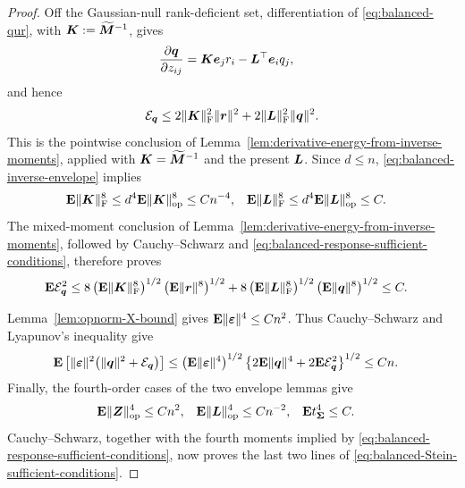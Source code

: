 \documentclass{article}
\theoremstyle{plain} %
\theoremstyle{definition} %
\theoremstyle{definition} %
\begin{document}
\begin{proof}
Off the Gaussian-null rank-deficient set, differentiation of
\eqref{eq:balanced-qur}, with $\boldsymbol{K}:=\widetilde{\boldsymbol{M}}^{-1}$, gives
\begin{align}
    \pdv{\boldsymbol{q}}{z_{ij}}
    &=\boldsymbol{K}\boldsymbol{e}_jr_i-\boldsymbol{L}^\top\boldsymbol{e}_iq_j,
    \label{eq:balanced-dot-q}
\end{align}
and hence
\begin{align}
    {\mathcal E}_{\boldsymbol{q}}
    \leq
      2\lVert\boldsymbol{K}\rVert_{\rm F}^2\lVert\boldsymbol{r}\rVert^2
      +2\lVert\boldsymbol{L}\rVert_{\rm F}^2\lVert\boldsymbol{q}\rVert^2.
    \label{eq:balanced-Dq-energy}
\end{align}
This is the pointwise conclusion of
Lemma~\ref{lem:derivative-energy-from-inverse-moments}, applied with
$\boldsymbol{K}=\widetilde{\boldsymbol{M}}^{-1}$ and the present $\boldsymbol{L}$.
Since $d\leq n$, \eqref{eq:balanced-inverse-envelope} implies
\begin{align*}
    {\mathbf{E}}\lVert\boldsymbol{K}\rVert_{\rm F}^{8}
    &\leq d^4{\mathbf{E}}\lVert\boldsymbol{K}\rVert_{\rm op}^{8}\leq Cn^{-4},
    &
    {\mathbf{E}}\lVert\boldsymbol{L}\rVert_{\rm F}^{8}
    &\leq d^4{\mathbf{E}}\lVert\boldsymbol{L}\rVert_{\rm op}^{8}\leq C.
\end{align*}
The mixed-moment conclusion of
Lemma~\ref{lem:derivative-energy-from-inverse-moments}, followed by
Cauchy--Schwarz and \eqref{eq:balanced-response-sufficient-conditions},
therefore proves
\begin{align*}
    {\mathbf{E}}{\mathcal E}_{\boldsymbol{q}}^2
    &\leq
      8\left({\mathbf{E}}\lVert\boldsymbol{K}\rVert_{\rm F}^{8}\right)^{1/2}
        \left({\mathbf{E}}\lVert\boldsymbol{r}\rVert^{8}\right)^{1/2}
      +8\left({\mathbf{E}}\lVert\boldsymbol{L}\rVert_{\rm F}^{8}\right)^{1/2}
        \left({\mathbf{E}}\lVert\boldsymbol{q}\rVert^{8}\right)^{1/2}
      \leq C.
\end{align*}

Lemma~\ref{lem:opnorm-X-bound} gives
${\mathbf{E}}\lVert{\boldsymbol{\varepsilon} }\rVert^{4}\leq Cn^2$.  Thus Cauchy--Schwarz and Lyapunov's
inequality give
\begin{align*}
    {\mathbf{E}}\left[
       \lVert{\boldsymbol{\varepsilon} }\rVert^{2}
       \bigl(\lVert\boldsymbol{q}\rVert^{2}+{\mathcal E}_{\boldsymbol{q}}\bigr)
    \right]
    &\leq
    \left({\mathbf{E}}\lVert{\boldsymbol{\varepsilon} }\rVert^{4}\right)^{1/2}
    \left\{2{\mathbf{E}}\lVert\boldsymbol{q}\rVert^{4}+2{\mathbf{E}}{\mathcal E}_{\boldsymbol{q}}^{2}\right\}^{1/2}
    \leq Cn.
\end{align*}
Finally, the fourth-order cases of the two envelope lemmas give
\begin{align*}
    {\mathbf{E}}\lVert\boldsymbol{Z}\rVert_{\rm op}^{4}&\leq Cn^2,
    & {\mathbf{E}}\lVert\boldsymbol{L}\rVert_{\rm op}^{4}&\leq Cn^{-2},
    & {\mathbf{E}} t_{\boldsymbol{\Sigma}}^{4}&\leq C.
\end{align*}
Cauchy--Schwarz, together with the fourth moments implied by
\eqref{eq:balanced-response-sufficient-conditions}, now proves the last two
lines of \eqref{eq:balanced-Stein-sufficient-conditions}.


\end{proof}
\end{document}
